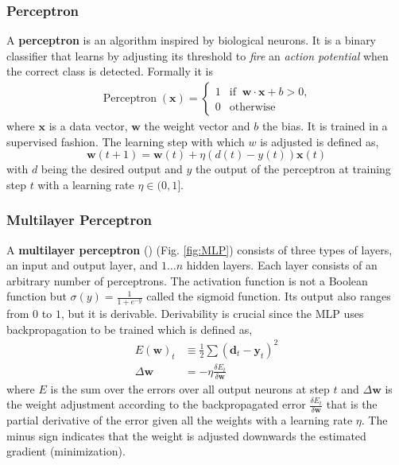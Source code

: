 \subsubsection{Perceptron}
  A \textbf{perceptron} is an algorithm inspired by biological neurons. It is a binary classifier that learns by adjusting its threshold to \emph{fire} an \emph{action potential} when the correct class is detected. Formally it is
  \begin{gather}
    \operatorname{Perceptron}(\mathbf{x}) = \begin{cases}1 & \text{if }\ \mathbf{w} \cdot \mathbf{x} + b > 0,\\
    0 & \text{otherwise}\end{cases}
  \end{gather}
  where $\mathbf{x}$ is a data vector, $\mathbf{w}$ the weight vector and $b$ the bias. It is trained in a supervised fashion. The learning step with which $w$ is adjusted is defined as,
  \[\mathbf{w}(t+1) = \mathbf{w}(t) + \eta (d(t) - y(t))\mathbf{x}(t)\]
  with $d$ being the desired output and $y$ the output of the perceptron at training step $t$ with a learning rate $\eta \in (0,1]$.

\subsubsection{Multilayer Perceptron}\label{backpropa}
  A \textbf{multilayer perceptron} () (Fig. \ref{fig:MLP}) consists of three types of layers, an input and output layer, and $1 \dots n$ hidden layers.
  Each layer consists of an arbitrary number of perceptrons.
  The activation function is not a Boolean function but $\sigma(y) = \frac{1}{1+e^{-y}}$ called the sigmoid function.
  Its output also ranges from $0$ to $1$, but it is derivable.
  Derivability is crucial since the MLP uses backpropagation to be trained which is defined as,
  \begin{align}
    E(\mathbf{w})_t &\equiv \frac{1}{2} \sum (\mathbf{d}_t - \mathbf{y}_t)^2 \\
    \Delta \mathbf{w} &= - \eta \frac{\delta E_t}{\delta \mathbf{w}}
  \end{align}
  where $E$ is the sum over the errors over all output neurons at step $t$ and $\Delta \mathbf{w}$ is the weight adjustment according to the backpropagated error $\frac{\delta E_t}{\delta \mathbf{w}}$ that is the partial derivative of the error given all the weights with a learning rate $\eta$.
  The minus sign indicates that the weight is adjusted downwards the estimated gradient (minimization).


